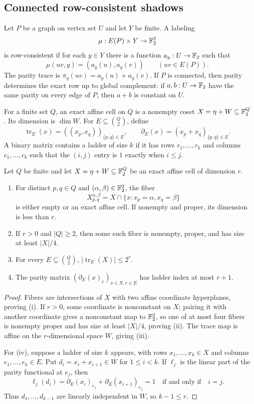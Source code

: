 \subsection{Connected row-consistent shadows}

Let $P$ be a graph on vertex set $U$ and let $Y$ be finite. A labeling
\[
  \mu:E(P)\times Y\to \mathbb F_2^2
\]
is row-consistent if for each $y\in Y$ there is a function $a_y:U\to \mathbb F_2$ such that
\[
  \mu(uv,y)=(a_y(u),a_y(v))\qquad (uv\in E(P)).
\]
The parity trace is $\pi_y(uv)=a_y(u)+a_y(v)$. If $P$ is connected, then parity determines the exact row up to global complement: if $a,b:U\to \mathbb F_2$ have the same parity on every edge of $P$, then $a+b$ is constant on $U$.

For a finite set $Q$, an exact affine cell on $Q$ is a nonempty coset $X=\eta+W\subseteq \mathbb F_2^Q$. Its dimension is $\dim W$. For $E\subseteq \binom Q2$, define
\[
  \operatorname{tr}_E(x)=((x_p,x_q))_{\{p,q\}\in E},
  \qquad
  \partial_E(x)=(x_p+x_q)_{\{p,q\}\in E}.
\]
A binary matrix contains a ladder of size $k$ if it has rows $r_1,\dots,r_k$ and columns $c_1,\dots,c_k$ such that the $(i,j)$ entry is $1$ exactly when $i\le j$.

\begin{theorem}\label{thm:affine-cell}
Let $Q$ be finite and let $X=\eta+W\subseteq \mathbb F_2^Q$ be an exact affine cell of dimension $r$.
\begin{enumerate}[label=(\roman*)]
\item For distinct $p,q\in Q$ and $(\alpha,\beta)\in \mathbb F_2^2$, the fiber
\[
  X^{\alpha,\beta}_{p,q}=X\cap\{x:x_p=\alpha, x_q=\beta\}
\]
is either empty or an exact affine cell. If nonempty and proper, its dimension is less than $r$.
\item If $r>0$ and $|Q|\ge 2$, then some such fiber is nonempty, proper, and has size at least $|X|/4$.
\item For every $E\subseteq \binom Q2$, $|\operatorname{tr}_E(X)|\le 2^r$.
\item The parity matrix $(\partial_E(x)_e)_{x\in X,e\in E}$ has ladder index at most $r+1$.
\end{enumerate}
\end{theorem}

\begin{proof}
Fibers are intersections of $X$ with two affine coordinate hyperplanes, proving (i). If $r>0$, some coordinate is nonconstant on $X$; pairing it with another coordinate gives a nonconstant map to $\mathbb F_2^2$, so one of at most four fibers is nonempty proper and has size at least $|X|/4$, proving (ii). The trace map is affine on the $r$-dimensional space $W$, giving (iii).

For (iv), suppose a ladder of size $k$ appears, with rows $x_1,\dots,x_k\in X$ and columns $e_1,\dots,e_k\in E$. Put $d_i=x_i+x_{i+1}\in W$ for $1\le i<k$. If $\ell_j$ is the linear part of the parity functional at $e_j$, then
\[
  \ell_j(d_i)=\partial_E(x_i)_{e_j}+\partial_E(x_{i+1})_{e_j}=1
  \quad\text{if and only if}\quad i=j.
\]
Thus $d_1,\dots,d_{k-1}$ are linearly independent in $W$, so $k-1\le r$.
\end{proof}

